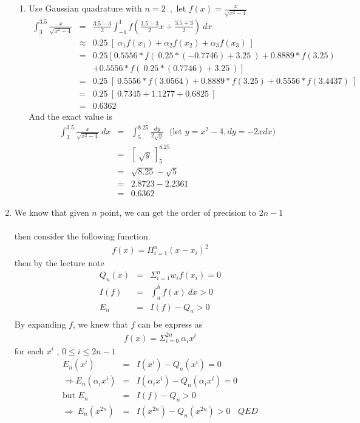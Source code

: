 \documentclass[12pt]{article}
\begin{document}
\begin{enumerate}
\begin{enumerate}
            \item %
            Use Gaussian quadrature with $n = 2$~,~let $f(x) = \frac{x}{\sqrt{x^2-4}}$
            \begin{eqnarray*}
            \int_{3}^{3.5}\frac{x}{\sqrt{x^2-4}}&=&\frac{3.5-3}{2}\int_{-1}^{1}f\left(\frac{3.5-3}{2}x+\frac{3.5+3}{2}\right)~dx\\
            &\approx& 0.25~[~\alpha_1 f(x_1)+\alpha_2 f(x_2)+\alpha_3 f(x_3)~]\\
            &=&0.25~[~0.5556*f(~0.25*(-0.7746)+3.25~)+0.8889*f(3.25)\\
            &&+0.5556*f(~0.25*(0.7746)+3.25~)~]\\
            &=&0.25~[~0.5556*f(3.0564)+0.8889*f(3.25)+0.5556*f(3.4437)~]\\
            &=&0.25~[~0.7345+1.1277+0.6825~]\\
            &=&0.6362
            \end{eqnarray*}
            And the exact value is
            \begin{eqnarray*}
            \int_{3}^{3	.5}\frac{x}{\sqrt{x^2-4}}~dx&=&\int_{5}^{8.25}\frac{dy}{2\sqrt{y}}
            ~~~\text{(let $y=x^2-4 , dy=-2xdx$)}\\
            &=&[~\sqrt{y}~]_{5}^{8.25}\\
            &=&\sqrt{8.25}-\sqrt{5}\\
            &=&2.8723-2.2361\\
            &=&0.6362
            \end{eqnarray*}            
        \end{enumerate}
	\item 
	We know that given $n$ point, we can get the order of precision to $2n-1$ \\\\
	then consider the following function. \\
	\begin{eqnarray*}
	f(x)={\Pi_{i=1}^{n}}(x-x_i)^2
	\end{eqnarray*}
	then by the lecture note
	\begin{eqnarray*}
	Q_{n}(x)&=&\Sigma_{i=1}^{n}w_{i}f(x_i)=0 \\
	I(f)&=&\int_{a}^{b}f(x)~dx>0 \\
	E_{n}&=&I(f)-Q_{n}>0\\
	\end{eqnarray*}
	By expanding $f$, we knew that $f$ can be express as
	\begin{eqnarray*}
    f(x)=\Sigma_{i=0}^{2n}~\alpha_{i}x^{i}
	\end{eqnarray*}
	for each $x^{i}$ , $0 \leq i \leq 2n-1$
	\begin{eqnarray*}
	E_{n}(x^i)&=&I(x^i)-Q_{n}(x^i)=0\\
	\Rightarrow E_{n}(\alpha_{i}x^i)&=&I(\alpha_{i}x^i)-Q_{n}(\alpha_{i}x^i)=0\\	
	\text{but } E_{n}&=&I(f)-Q_{n}>0\\
	\Rightarrow \ E_{n}(x^{2n})&=&I(x^{2n})-Q_{n}(x^{2n})>0 ~~~~QED
	\end{eqnarray*}
	

\end{enumerate}
\end{document}
